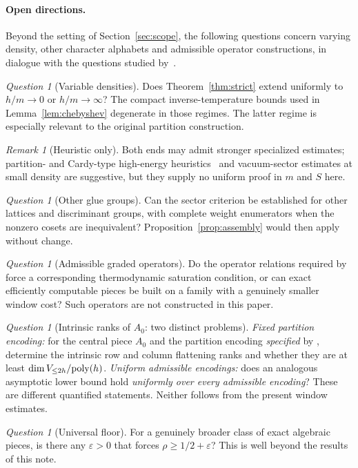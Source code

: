 \documentclass[10pt,a4paper]{article}
\numberwithin{equation}{section}
\theoremstyle{remark}\newtheorem{remark}[theorem]{Remark}\newtheorem{question}[theorem]{Question}
\begin{document}
\paragraph{Open directions.}
Beyond the setting of Section~\ref{sec:scope}, the following questions
concern varying density, other character alphabets and admissible
operator constructions, in dialogue with the questions studied by~\cite{majdoddin}.
\begin{question}[Variable densities]\label{q:density}
Does Theorem~\ref{thm:strict} extend uniformly to $h/m\to0$ or $h/m\to\infty$? The compact inverse-temperature bounds used in Lemma~\ref{lem:chebyshev} degenerate in those regimes. The latter regime is especially relevant to the original partition construction.
\end{question}
\begin{remark}[Heuristic only]Both ends may admit stronger specialized estimates; partition- and Cardy-type high-energy heuristics~\cite{cardy,hks}
and vacuum-sector estimates at small density are suggestive,
but they supply no uniform proof in $m$ and $S$ here.\end{remark}
\begin{question}[Other glue groups]\label{q:other}
Can the sector criterion be established for other lattices and discriminant groups, with complete weight enumerators when the nonzero cosets are inequivalent? Proposition~\ref{prop:assembly} would then apply without change.
\end{question}
\begin{question}[Admissible graded operators]\label{q:operators}
Do the operator relations required by \cite[Appendix B]{claude3sat} force a corresponding thermodynamic saturation condition, or can exact efficiently computable pieces be built on a family with a genuinely smaller window cost? Such operators are not constructed in this paper.
\end{question}
\begin{question}[Intrinsic ranks of $A_0$: two distinct problems]\label{q:ranks}
\emph{Fixed partition encoding:} for the central piece $A_0$ and the partition encoding \emph{specified} by \cite[Appendix B]{claude3sat}, determine the intrinsic row and column flattening ranks and whether they are at least $\operatorname{dim} V_{\le2h}/\mathrm{poly}(h)$. \emph{Uniform admissible encodings:} does an analogous asymptotic lower bound hold \emph{uniformly over every admissible encoding}? These are different quantified statements. Neither follows from the present window estimates.
\end{question}
\begin{question}[Universal floor]
For a genuinely broader class of exact algebraic pieces, is there any $\varepsilon>0$ that forces $\rho\ge1/2+\varepsilon$? This is well beyond the results of this note.
\end{question}
\end{document}
